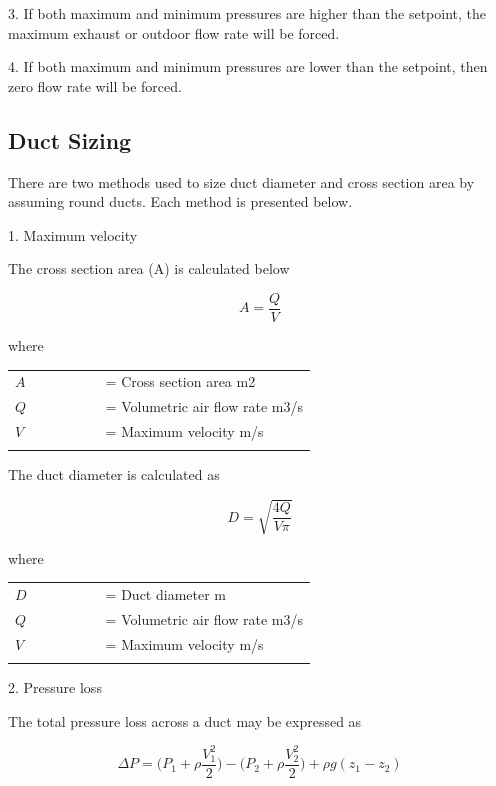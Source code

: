 3. If both maximum and minimum pressures are higher than the setpoint, the maximum exhaust or outdoor flow rate will be forced.

4. If both maximum and minimum pressures are lower than the setpoint, then zero flow rate will be forced.

\subsection{Duct Sizing}\label{duct-sizingl}

There are two methods used to size duct diameter and cross section area by assuming round ducts. Each method is presented below.

1. Maximum velocity

The cross section area (A) is calculated below

\begin{equation}
A =  \frac{Q}{V}
\end{equation}

where

\begin{tabular}{lp{0.7\linewidth}}
\\
$A$ &= Cross section area {m2}\\
$Q$ &= Volumetric air flow rate {m3/s}\\
$V $ &= Maximum velocity {m/s}\\
\\
\end{tabular}

The duct diameter is calculated as

\begin{equation}
D = \sqrt{\frac{4Q}{V \pi } }
\end{equation}

where

\begin{tabular}{lp{0.7\linewidth}}
\\
$D$ &= Duct diameter {m}\\
$Q$ &= Volumetric air flow rate {m3/s}\\
$V $ &= Maximum velocity {m/s}\\
\\
\end{tabular}


2. Pressure loss

The total pressure loss across a duct may be expressed as

\begin{equation}
\Delta P =  \big( P_{1} +  \rho  \frac{V_{1}^2}{2}  )  - \big( P_{2} +  \rho  \frac{V_{2}^2}{2}  ) +  \rho g(z_{1} - z_{2} )
\end{equation}

